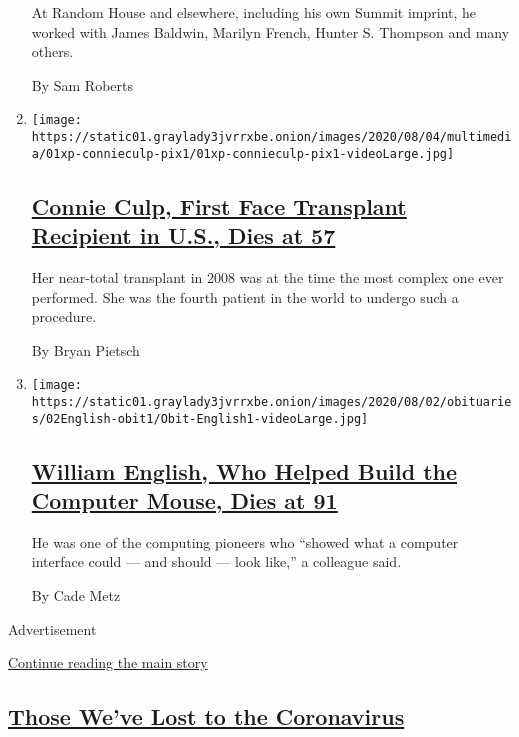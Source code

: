 \begin{enumerate}
  At Random House and elsewhere, including his own Summit imprint, he
  worked with James Baldwin, Marilyn French, Hunter S. Thompson and many
  others.

  By Sam Roberts
\item
  \texttt{[image: https://static01.graylady3jvrrxbe.onion/images/2020/08/04/multimedia/01xp-connieculp-pix1/01xp-connieculp-pix1-videoLarge.jpg]}

  \hypertarget{connie-culp-first-face-transplant-recipient-in-us-dies-at-57}{%
  \subsection{\texorpdfstring{\href{/2020/08/01/us/Connie-culp-dead-face-transplant.html}{Connie
  Culp, First Face Transplant Recipient in U.S., Dies at
  57}}{Connie Culp, First Face Transplant Recipient in U.S., Dies at 57}}\label{connie-culp-first-face-transplant-recipient-in-us-dies-at-57}}

  Her near-total transplant in 2008 was at the time the most complex one
  ever performed. She was the fourth patient in the world to undergo
  such a procedure.

  By Bryan Pietsch
\item
  \texttt{[image: https://static01.graylady3jvrrxbe.onion/images/2020/08/02/obituaries/02English-obit1/Obit-English1-videoLarge.jpg]}

  \hypertarget{william-english-who-helped-build-the-computer-mouse-dies-at-91}{%
  \subsection{\texorpdfstring{\href{/2020/07/31/technology/william-english-who-helped-build-the-computer-mouse-dies-at-91.html}{William
  English, Who Helped Build the Computer Mouse, Dies at
  91}}{William English, Who Helped Build the Computer Mouse, Dies at 91}}\label{william-english-who-helped-build-the-computer-mouse-dies-at-91}}

  He was one of the computing pioneers who ``showed what a computer
  interface could --- and should --- look like,'' a colleague said.

  By Cade Metz
\end{enumerate}

Advertisement

\protect\hyperlink{after-mid1}{Continue reading the main story}

\hypertarget{those-weve-lost-to-the-coronavirus}{%
\subsection{\texorpdfstring{\href{/series/people-died-coronavirus-obituaries}{Those
We've Lost to the
Coronavirus}}{Those We've Lost to the Coronavirus}}\label{those-weve-lost-to-the-coronavirus}}

